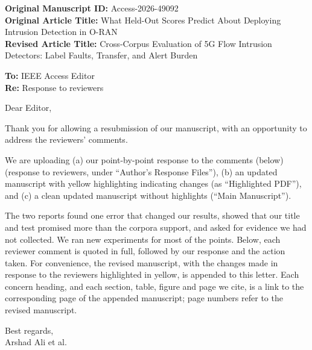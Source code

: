 \documentclass[10pt]{article}
\begin{document}
\textbf{Original Manuscript ID:} Access-2026-49092\\
\textbf{Original Article Title:} What Held-Out Scores Predict About Deploying Intrusion Detection in O-RAN\\
\textbf{Revised Article Title:} Cross-Corpus Evaluation of 5G Flow Intrusion Detectors: Label Faults, Transfer, and Alert Burden

\textbf{To:} IEEE Access Editor\\
\textbf{Re:} Response to reviewers

Dear Editor,

Thank you for allowing a resubmission of our manuscript, with an opportunity to address the reviewers' comments.

We are uploading (a) our point-by-point response to the comments (below) (response to reviewers, under ``Author's Response Files''), (b) an updated manuscript with yellow highlighting indicating changes (as ``Highlighted PDF''), and (c) a clean updated manuscript without highlights (``Main Manuscript'').

The two reports found one error that changed our results, showed that our title and test promised more than the corpora support, and asked for evidence we had not collected. We ran new experiments for most of the points. Below, each reviewer comment is quoted in full, followed by our response and the action taken. For convenience, the revised manuscript, with the changes made in response to the reviewers highlighted in yellow, is appended to this letter. Each concern heading, and each section, table, figure and page we cite, is a link to the corresponding page of the appended manuscript; page numbers refer to the revised manuscript.

Best regards,\\
Arshad Ali et al.
\end{document}
